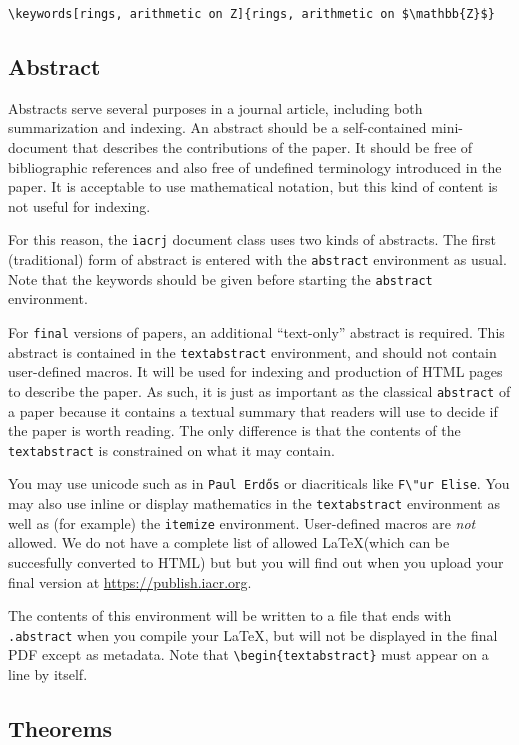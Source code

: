 \documentclass[journal=cic,version=preprint]{iacrj}
\begin{document}
\texttt{\textbackslash keywords[rings, arithmetic on Z]\{rings, arithmetic on \$\textbackslash mathbb\{Z\}\$\}}

\subsection{Abstract}
Abstracts serve several purposes in a journal article, including both
summarization and indexing. An abstract should be a self-contained
mini-document that describes the contributions of the paper. It
should be free of bibliographic references and also free of undefined
terminology introduced in the paper. It is acceptable to use
mathematical notation, but this kind of content is not useful for
indexing.

For this reason, the \texttt{iacrj} document class uses two kinds
of abstracts. The first (traditional) form of abstract is entered with the
\texttt{abstract} environment as usual.  Note that the keywords should
be given before starting the \texttt{abstract} environment.

For \texttt{final} versions of papers, an additional ``text-only''
abstract is required. This abstract is contained in the
\texttt{textabstract} environment, and should not contain
user-defined macros.
It will be used for indexing and production of
{HTML} pages to describe the paper. As such, it is just as important
as the classical \texttt{abstract} of a paper because it contains a
textual summary that readers will use to decide if the paper is worth
reading. The only difference is that the contents of the
\texttt{textabstract} is constrained on what it may contain.

You may use unicode such as in \verb+Paul Erdős+ or
diacriticals like \verb+F\"ur Elise+.
You may also use inline or display mathematics
in the \texttt{textabstract} environment as well as
(for example) the  \texttt{itemize} environment.
User-defined macros are \emph{not} allowed.
We do not have a complete list of allowed
\LaTeX (which can be succesfully converted to HTML) but
but you will find out when you upload your final version
at \url{https://publish.iacr.org}.

The contents of this environment will be written to a file that ends
with \texttt{.abstract} when you compile your \LaTeX, but will not be
displayed in the final PDF except as metadata. Note that
\verb+\begin{textabstract}+ must appear on a line by itself.

\subsection{Theorems}
\end{document}
